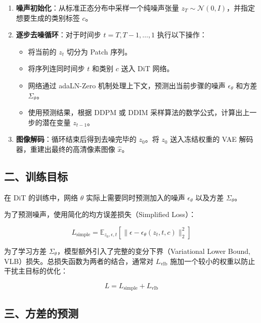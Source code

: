 \begin{enumerate}
\def\labelenumi{\arabic{enumi}.}
\tightlist
\item
  \textbf{噪声初始化}：从标准正态分布中采样一个纯噪声张量 \(z_T\sim\mathcal{N}(0,I)\)，并指定想要生成的类别标签 \(c\)。
\item
  \textbf{逐步去噪循环}：对于时间步 \(t=T,T-1,\ldots,1\) 执行以下操作：

  \begin{itemize}
  \tightlist
  \item
    将当前的 \(z_t\) 切分为 Patch 序列。
  \item
    将序列连同时间步 \(t\) 和类别 \(c\) 送入 DiT 网络。
  \item
    网络通过 adaLN-Zero 机制处理上下文，预测出当前步骤的噪声 \(\epsilon_\theta\) 和方差 \(\Sigma_\theta\)。
  \item
    使用预测结果，根据 DDPM 或 DDIM 采样算法的数学公式，计算出上一步的潜在变量 \(z_{t-1}\)。
  \end{itemize}
\item
  \textbf{图像解码}：循环结束后得到去噪完毕的 \(z_0\)。将 \(z_0\) 送入冻结权重的 VAE 解码器，重建出最终的高清像素图像 \(\hat{x}\)。
\end{enumerate}

\hypertarget{ux4e8cux8badux7ec3ux76eeux6807}{%
\subsection{二、训练目标}\label{ux4e8cux8badux7ec3ux76eeux6807}}

在 DiT 的训练中，网络 \(\theta\) 实际上需要同时预测加入的噪声 \(\epsilon_\theta\) 以及方差 \(\Sigma_\theta\)。

为了预测噪声，使用简化的均方误差损失（Simplified Loss）：

\[
L_{\mathrm{simple}}=\mathbb{E}_{z_0,\epsilon,t}\left[\lVert \epsilon-\epsilon_\theta(z_t,t,c)\rVert_2^2\right]
\]

为了学习方差 \(\Sigma_\theta\)，模型额外引入了完整的变分下界（Variational Lower Bound, VLB）损失。总损失函数为两者的结合，通常对 \(L_{\mathrm{vlb}}\) 施加一个较小的权重以防止干扰主目标的优化：

\[
L=L_{\mathrm{simple}}+L_{\mathrm{vlb}}
\]

\hypertarget{ux4e09ux65b9ux5deeux7684ux9884ux6d4b}{%
\subsection{三、方差的预测}\label{ux4e09ux65b9ux5deeux7684ux9884ux6d4b}}


